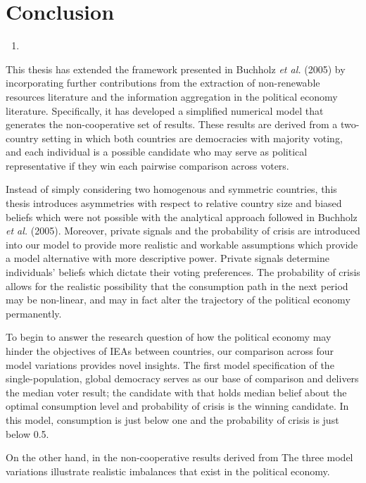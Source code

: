 \documentclass[11pt,preprint, authoryear]{elsarticle}
\numberwithin{equation}{section}
\numberwithin{figure}{section}
\numberwithin{table}{section}
\def\tightlist{} %
\begin{document}
\hypertarget{conclusion}{%
\section{Conclusion}\label{conclusion}}

\begin{enumerate}
\def\labelenumi{(\arabic{enumi})}
\setcounter{enumi}{799}
\tightlist
\item
\end{enumerate}

This thesis has extended the framework presented in Buchholz \emph{et
al.} (2005) by incorporating further contributions from the extraction
of non-renewable resources literature and the information aggregation in
the political economy literature. Specifically, it has developed a
simplified numerical model that generates the non-cooperative set of
results. These results are derived from a two-country setting in which
both countries are democracies with majority voting, and each individual
is a possible candidate who may serve as political representative if
they win each pairwise comparison across voters.

Instead of simply considering two homogenous and symmetric countries,
this thesis introduces asymmetries with respect to relative country size
and biased beliefs which were not possible with the analytical approach
followed in Buchholz \emph{et al.} (2005). Moreover, private signals and
the probability of crisis are introduced into our model to provide more
realistic and workable assumptions which provide a model alternative
with more descriptive power. Private signals determine individuals'
beliefs which dictate their voting preferences. The probability of
crisis allows for the realistic possibility that the consumption path in
the next period may be non-linear, and may in fact alter the trajectory
of the political economy permanently.

To begin to answer the research question of how the political economy
may hinder the objectives of IEAs between countries, our comparison
across four model variations provides novel insights. The first model
specification of the single-population, global democracy serves as our
base of comparison and delivers the median voter result; the candidate
with that holds median belief about the optimal consumption level and
probability of crisis is the winning candidate. In this model,
consumption is just below one and the probability of crisis is just
below 0.5.

On the other hand, in the non-cooperative results derived from The three
model variations illustrate realistic imbalances that exist in the
political economy.
\end{document}
